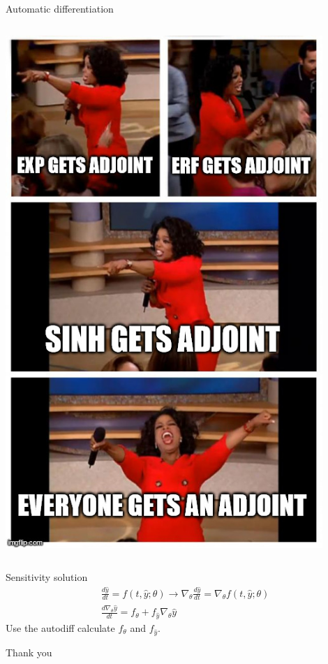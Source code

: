 \documentclass[bigger]{beamer}
\begin{document}
\begin{frame}[label={sec:org6d92043}]{Automatic differentiation}
\begin{columns}
\begin{column}{0.5\columnwidth}
\begin{center}
\includegraphics[width=0.9\textwidth]{./figure/everyone_adjoint.jpg}
\end{center}
\end{column}
\end{columns}
\end{frame}

\begin{frame}[label={sec:org86b8957}]{Sensitivity solution}
\begin{align*}
  &\frac{d\hat{y}}{dt} = f(t, \hat{y};\theta) \rightarrow \nabla_{\theta} \frac{d\hat{y}}{dt} = \nabla_{\theta} f(t, \hat{y};\theta)\\
  &\frac{d\nabla_{\theta} \hat{y}}{dt} = f_{\theta} + f_{\hat{y}}\nabla_{\theta}\hat{y}
\end{align*}
Use the autodiff calculate \(f_{\theta}\) and \(f_{\hat{y}}\).
\end{frame}


\begin{frame}[label={sec:org1f18bda}]{Thank you}
\end{frame}
\end{document}

